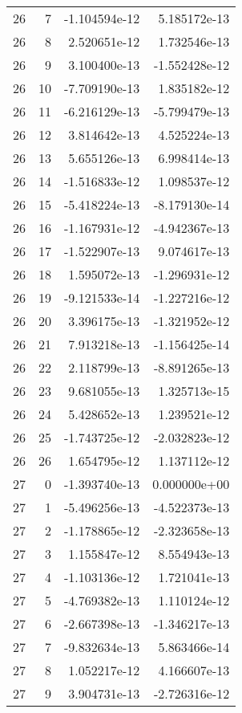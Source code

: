 \begin{tabular}{rrrr}
  26 &    7 & -1.104594e-12 &  5.185172e-13 \\
  26 &    8 &  2.520651e-12 &  1.732546e-13 \\
  26 &    9 &  3.100400e-13 & -1.552428e-12 \\
  26 &   10 & -7.709190e-13 &  1.835182e-12 \\
  26 &   11 & -6.216129e-13 & -5.799479e-13 \\
  26 &   12 &  3.814642e-13 &  4.525224e-13 \\
  26 &   13 &  5.655126e-13 &  6.998414e-13 \\
  26 &   14 & -1.516833e-12 &  1.098537e-12 \\
  26 &   15 & -5.418224e-13 & -8.179130e-14 \\
  26 &   16 & -1.167931e-12 & -4.942367e-13 \\
  26 &   17 & -1.522907e-13 &  9.074617e-13 \\
  26 &   18 &  1.595072e-13 & -1.296931e-12 \\
  26 &   19 & -9.121533e-14 & -1.227216e-12 \\
  26 &   20 &  3.396175e-13 & -1.321952e-12 \\
  26 &   21 &  7.913218e-13 & -1.156425e-14 \\
  26 &   22 &  2.118799e-13 & -8.891265e-13 \\
  26 &   23 &  9.681055e-13 &  1.325713e-15 \\
  26 &   24 &  5.428652e-13 &  1.239521e-12 \\
  26 &   25 & -1.743725e-12 & -2.032823e-12 \\
  26 &   26 &  1.654795e-12 &  1.137112e-12 \\
  27 &    0 & -1.393740e-13 &  0.000000e+00 \\
  27 &    1 & -5.496256e-13 & -4.522373e-13 \\
  27 &    2 & -1.178865e-12 & -2.323658e-13 \\
  27 &    3 &  1.155847e-12 &  8.554943e-13 \\
  27 &    4 & -1.103136e-12 &  1.721041e-13 \\
  27 &    5 & -4.769382e-13 &  1.110124e-12 \\
  27 &    6 & -2.667398e-13 & -1.346217e-13 \\
  27 &    7 & -9.832634e-13 &  5.863466e-14 \\
  27 &    8 &  1.052217e-12 &  4.166607e-13 \\
  27 &    9 &  3.904731e-13 & -2.726316e-12 \\

\end{tabular}
